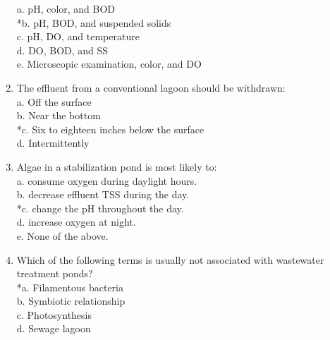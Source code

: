 \begin{enumerate}
a. pH, color, and BOD \\

*b. pH, BOD, and suspended solids \\

c. pH, DO, and temperature \\

d. DO, BOD, and SS \\

e. Microscopic examination, color, and DO \\


\item  The effluent from a conventional lagoon should be withdrawn: \\


a. Off the surface \\

b. Near the bottom \\

*c. Six to eighteen inches below the surface \\

d. Intermittently \\


\item  Algae in a stabilization pond is most likely to: \\


a. consume oxygen during daylight hours. \\

b. decrease effluent TSS during the day. \\

*c. change the pH throughout the day. \\

d. increase oxygen at night. \\

e. None of the above. \\


\item  Which of the following terms is usually not associated with wastewater treatment ponds? \\


*a. Filamentous bacteria \\

b. Symbiotic relationship \\

c. Photosynthesis \\

d. Sewage lagoon \\


\end{enumerate}
